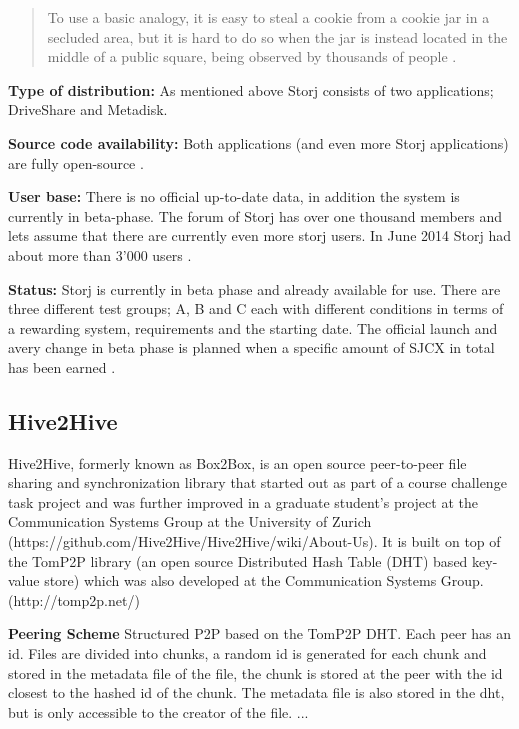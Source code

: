 \begin{quotation}
To use a basic analogy, it is easy to steal a cookie from a cookie jar in a secluded area, but it is hard to do so when the jar is instead located in the middle of a public square, being observed by thousands of people \cite{storj:PDF}.
\end{quotation}

\textbf{Type of distribution:} As mentioned above Storj consists of two applications; DriveShare and Metadisk.

\textbf{Source code availability:} Both applications (and even more Storj applications) are fully open-source \cite{storj:github}.

\textbf{User base:} There is no official up-to-date data, in addition the system is currently in beta-phase. The forum of Storj has over one thousand members \cite{storj:forum} and lets assume that there are currently even more storj users. In June 2014 Storj had about more than 3'000 users \cite{storj:crowdsale}.

\textbf{Status:} Storj is currently in beta phase and already available for use. There are three different test groups; A, B and C each with different conditions in terms of a rewarding system, requirements and the starting date. The official launch and avery change in beta phase is planned when a specific amount of SJCX in total has been earned \cite {storj:earlyaccess}.

\subsection{Hive2Hive} %
Hive2Hive, formerly known as Box2Box, is an open source peer-to-peer file sharing and synchronization library that started out as part of a course challenge task project and was further improved in a graduate student's project at the Communication Systems Group at the University of Zurich (https://github.com/Hive2Hive/Hive2Hive/wiki/About-Us). It is built on top of the TomP2P library (an open source Distributed Hash Table (DHT) based key-value store) which was also developed at the Communication Systems Group. (http://tomp2p.net/)

\textbf{Peering Scheme}
Structured P2P based on the TomP2P DHT. Each peer has an id. Files are divided into chunks, a random id is generated for each chunk and stored in the metadata file of the file, the chunk is stored at the peer with the id closest to the hashed id of the chunk. The metadata file is also stored in the dht, but is only accessible to the creator of the file. ...

